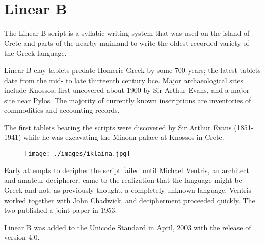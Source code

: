 
\section{Linear B}
\label{s:linearb}

The Linear B script is a syllabic writing system that was used on the island of Crete and
parts of the nearby mainland to write the oldest recorded variety of the Greek language.

Linear B clay tablets predate Homeric Greek by some 700 years; the latest tablets date from
the mid- to late thirteenth century bce. Major archaeological sites include Knossos, first
uncovered about 1900 by Sir Arthur Evans, and a major site near Pylos. The majority of
currently known inscriptions are inventories of commodities and accounting records.

The first tablets bearing the scripts were discovered by Sir Arthur Evans (1851-1941) while he was excavating the Minoan palace at Knossos in Crete. 


\medskip

\begin{figure}[ht]
\centering
\begin{minipage}{5cm}
\texttt{[image: ./images/iklaina.jpg]}
\end{minipage}\hspace{2em}
\begin{minipage}{7cm}
\end{minipage}

\end{figure}


Early attempts to decipher the script failed until Michael Ventris, an architect and amateur
decipherer, came to the realization that the language might be Greek and not, as previously
thought, a completely unknown language. Ventris worked together with John Chadwick,
and decipherment proceeded quickly. The two published a joint paper in 1953.


\newfontfamily{}

Linear B was added to the Unicode Standard in April, 2003 with the release of version 4.0.

